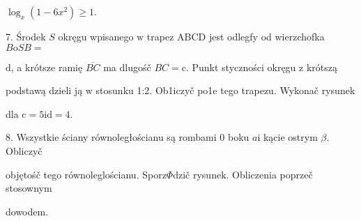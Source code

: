 \documentclass[a4paper,12pt]{article}
\begin{document}
$\log_{x}(1-6x^{2})\geq 1.$

7. Środek $S$ okręgu wpisanego $\mathrm{w}$ trapez ABCD jest odlegfy od wierzchofka $B\mathrm{o}SB=$

$\mathrm{d}$, a krótsze ramię $\overline{BC}$ ma dlugośč $BC = \mathrm{c}$. Punkt styczności okręgu $\mathrm{z}$ krótszą

podstawą dzieli ją $\mathrm{w}$ stosunku 1:2. Ob1iczyč po1e tego trapezu. Wykonač rysunek

dla $\mathrm{c}=5\mathrm{i}\mathrm{d}=4.$

8. Wszystkie ściany równoległościanu są rombami $0$ boku $a\mathrm{i}$ kącie ostrym $\beta$. Obliczyč

objętośč tego równoleglościanu. Sporz$\Phi$dzič rysunek. Obliczenia poprzeč stosownym

dowodem.
\end{document}
